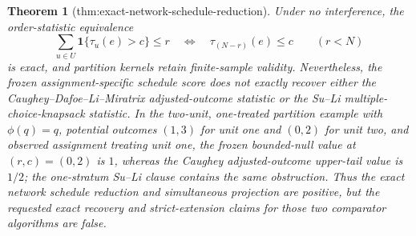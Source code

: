 \documentclass{article}
\newtheorem{theorem}{Theorem}
\begin{document}
\begin{theorem}[thm:exact-network-schedule-reduction]
Under no interference, the order-statistic equivalence
\[
\sum_{u\in U}\mathbf 1\{\tau_u(e)>c\}\leq r
\quad\Longleftrightarrow\quad
\tau_{(N-r)}(e)\leq c
\qquad(r<N)
\]
is exact, and partition kernels retain finite-sample validity.  Nevertheless, the frozen assignment-specific schedule score does not exactly recover either the Caughey--Dafoe--Li--Miratrix adjusted-outcome statistic or the Su--Li multiple-choice-knapsack statistic.  In the two-unit, one-treated partition example with \(\phi(q)=q\), potential outcomes \((1,3)\) for unit one and \((0,2)\) for unit two, and observed assignment treating unit one, the frozen bounded-null value at \((r,c)=(0,2)\) is \(1\), whereas the Caughey adjusted-outcome upper-tail value is \(1/2\); the one-stratum Su--Li clause contains the same obstruction.  Thus the exact network schedule reduction and simultaneous projection are positive, but the requested exact recovery and strict-extension claims for those two comparator algorithms are false.
\end{theorem}
\end{document}
